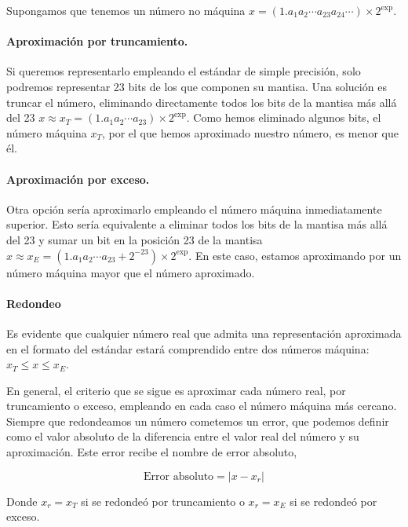 Supongamos que tenemos un número no máquina $x=(1.a_1a_2\cdots a_{23}a_{24}\cdots)\times2^{\text{exp}}$. 

\paragraph{Aproximación por truncamiento.} Si queremos representarlo empleando el estándar de simple precisión, solo podremos representar 23 bits de los que componen su mantisa. Una solución es truncar el número, eliminando directamente todos los bits de la mantisa más allá del 23 $x\approx x_T= (1.a_1a_2\cdots a_{23})\times2^{\text{exp}}$. Como hemos eliminado algunos bits, el número máquina $x_T$, por el que hemos aproximado nuestro número, es menor que él. 

\paragraph{Aproximación por exceso.}  Otra opción sería aproximarlo empleando el número máquina inmediatamente superior.  Esto sería equivalente a eliminar todos los bits de la mantisa más allá del 23 y sumar un bit en la posición 23 de la mantisa $x\approx x_E=  (1.a_1a_2\cdots a_{23}+2^{-23})\times2^{\text{exp}}$. En este caso, estamos aproximando por un número máquina mayor que el número aproximado.


\paragraph{Redondeo} Es evidente que cualquier número real que admita una representación aproximada en el formato del estándar estará comprendido entre dos números máquina: $x_T\leq x\leq x_E$. 


En general, el criterio que se sigue es aproximar cada número real, por truncamiento o exceso, empleando en cada caso el número máquina más cercano. 
Siempre que redondeamos un número cometemos un error, que podemos definir como el valor absoluto de la diferencia entre  el valor real  del número y su aproximación. Este error recibe el nombre de error absoluto,

\begin{equation*}
\text{Error absoluto}=\vert x-x_r\vert
\end{equation*}

Donde $x_r=x_T$ si se redondeó por truncamiento o $x_r=x_E$ si se redondeó por exceso.





